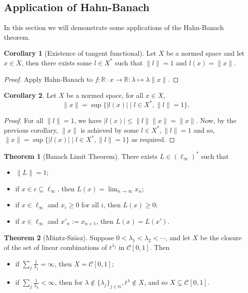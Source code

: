 \documentclass[]{article}
\theoremstyle{definition}
\newtheorem{theorem}{Theorem}
\theoremstyle{definition}
\newtheorem{corollary}{Corollary}[section]
\begin{document}
\subsection{Application of Hahn-Banach}

In this section we will demonstrate some applications of the Hahn-Banach theorem.

\begin{corollary}[Existence of tangent functional]
  Let \(X\) be a normed space and let \(x \in X\), then there exists some 
  \(l \in X^*\) such that \(\|l\| = 1\) and \(l(x) = \|x\|\).
\end{corollary}
\begin{proof}
  Apply Hahn-Banach to \(f : \mathbb{R} \cdot x \to \mathbb{R} : 
    \lambda \mapsto \lambda \|x\|\).
\end{proof}

\begin{corollary}
  Let \(X\) be a normed space, for all \(x \in X\), 
  \[\|x\| = \sup \{|l(x)| \mid l \in X^*, \|l\| = 1\}.\]
\end{corollary}
\begin{proof}
  For all \(\|l\| = 1\), we have \(|l(x)| \le \|l\| \|x\| = \|x\|\). 
  Now, by the previous corollary, \(\|x\|\) is achieved by some 
  \(l \in X^*, \|l\| = 1\) and so,  
  \(\|x\| = \sup \{|l(x)| \mid l \in X^*, \|l\| = 1\}\) as required.
\end{proof}

\begin{theorem}[Banach Limit Theorem]
  There exists \(L \in (\ell_\infty)^*\) such that 
  \begin{itemize}
    \item \(\|L\| = 1\);
    \item if \(x \in c \subseteq \ell_\infty\), 
      then \(L(x) = \lim_{n \to \infty} x_n\);
    \item if \(x \in \ell_\infty\) and \(x_i \ge 0\) for all \(i\), then 
      \(L(x) \ge 0\);
    \item if \(x \in \ell_\infty\) and \(x'_n := x_{n + 1}\), then 
      \(L(x) = L(x')\).
  \end{itemize}
\end{theorem}

\begin{theorem}[Müntz-Szäsz]
  Suppose \(0 < \lambda_1 < \lambda_2 < \cdots\), and let \(X\) be the 
  closure of the set of linear combinations of \(t^{\lambda_j}\) in 
  \(\mathcal{C}[0, 1]\). Then 
  \begin{itemize}
    \item if \(\sum_j \frac{1}{\lambda_j} = \infty\), 
      then \(X = \mathcal{C}[0, 1]\);
    \item if \(\sum_j \frac{1}{\lambda_k} < \infty\), then for 
      \(\lambda \notin \{\lambda_j\}_{j \in \mathbb{N}}, t^\lambda \notin X\), 
      and so \(X \subsetneq \mathcal{C}[0, 1]\). 
  \end{itemize}
\end{theorem}
\end{document}
